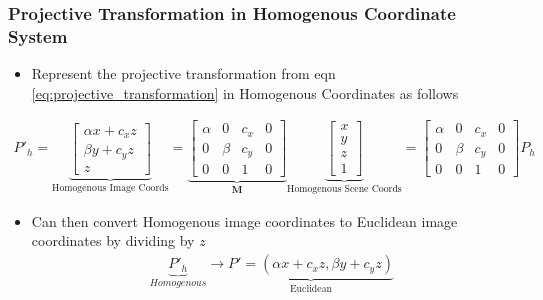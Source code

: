 \documentclass[letterpaper,12pt]{article}
\newcommand{\lra}{\ensuremath{\longrightarrow{}}}
\newcommand{\matr}[1]{\mathbf{#1}}
\begin{document}
\subsubsection{Projective Transformation in Homogenous Coordinate System}
\begin{itemize}
 \item Represent the projective transformation from eqn \ref{eq:projective_transformation} in Homogenous Coordinates as follows
\end{itemize}
\begin{align}
 P'_h = \underbrace{\begin{bmatrix}
   \alpha x + c_x z \\
   \beta y + c_y z  \\
   z
  \end{bmatrix}}_\text{Homogenous Image Coords}
 = \underbrace{\begin{bmatrix}
   \alpha & 0     & c_x & 0 \\
   0      & \beta & c_y & 0 \\
   0      & 0     & 1   & 0
  \end{bmatrix}}_\matr{M}
 \underbrace{\begin{bmatrix}
   x \\
   y \\
   z \\
   1
  \end{bmatrix}}_\text{Homogenous Scene Coords}
 = \begin{bmatrix}
  \alpha & 0     & c_x & 0 \\
  0      & \beta & c_y & 0 \\
  0      & 0     & 1   & 0
 \end{bmatrix}
 P_h
 \label{eq:homogenous_projective_transformation}
\end{align}
\begin{itemize}
 \item Can then convert Homogenous image coordinates to Euclidean image coordinates by dividing by $z$
       \begin{align}
        \underbrace{P'_h}_{Homogenous} \lra \underbrace{P' = (\alpha x + c_x z, \beta y + c_y z)}_\text{Euclidean}
       \end{align}
\end{itemize}
\end{document}
